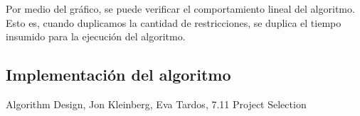 Por medio del gráfico, se puede verificar el comportamiento lineal del algoritmo.
Esto es, cuando duplicamos la cantidad de restricciones, se duplica el tiempo insumido para la ejecución del algoritmo.

\newpage

\subsection{Implementación del algoritmo}











\renewcommand\refname{Referencias}
\begin{thebibliography}{X}
 Algorithm Design, Jon Kleinberg, Eva Tardos, 7.11 Project Selection
\end{thebibliography}
\newpage

